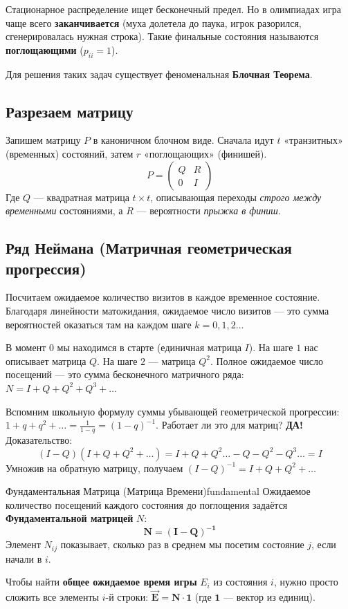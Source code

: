 \documentclass[12pt,a4paper]{article}
\begin{document}
Стационарное распределение ищет бесконечный предел. Но в олимпиадах игра чаще всего \textbf{заканчивается} (муха долетела до паука, игрок разорился, сгенерировалась нужная строка). Такие финальные состояния называются \textbf{поглощающими} ($p_{ii} = 1$). 

Для решения таких задач существует феноменальная \textbf{Блочная Теорема}.

\subsection{Разрезаем матрицу}
Запишем матрицу $P$ в каноничном блочном виде. Сначала идут $t$ «транзитных» (временных) состояний, затем $r$ «поглощающих» (финишей).
\[
P = \left( \begin{array}{c|c}
Q & R \\ \hline
0 & I
\end{array} \right)
\]
Где $Q$ — квадратная матрица $t \times t$, описывающая переходы \textit{строго между временными} состояниями, а $R$ — вероятности \textit{прыжка в финиш}.

\subsection{Ряд Неймана (Матричная геометрическая прогрессия)}
Посчитаем ожидаемое количество визитов в каждое временное состояние.
Благодаря линейности матожидания, ожидаемое число визитов — это сумма вероятностей оказаться там на каждом шаге $k=0, 1, 2 \dots$

В момент $0$ мы находимся в старте (единичная матрица $I$). На шаге $1$ нас описывает матрица $Q$. На шаге $2$ — матрица $Q^2$. Полное ожидаемое число посещений — это сумма бесконечного матричного ряда: $N = I + Q + Q^2 + Q^3 + \dots$

Вспомним школьную формулу суммы убывающей геометрической прогрессии: $1 + q + q^2 + \dots = \frac{1}{1-q} = (1-q)^{-1}$. Работает ли это для матриц? \textbf{ДА!}
Доказательство:
\[ (I - Q)(I + Q + Q^2 + \dots) = I + Q + Q^2 \dots - Q - Q^2 - Q^3 \dots = I \]
Умножив на обратную матрицу, получаем $(I - Q)^{-1} = I + Q + Q^2 + \dots$

\begin{theorem}{Фундаментальная Матрица (Матрица Времени)}{fundamental}
Ожидаемое количество посещений каждого состояния до поглощения задаётся \textbf{Фундаментальной матрицей} $N$:
\[ \mathbf{N = (I - Q)^{-1}} \]
Элемент $N_{ij}$ показывает, сколько раз в среднем мы посетим состояние $j$, если начали в $i$.

Чтобы найти \textbf{общее ожидаемое время игры} $E_i$ из состояния $i$, нужно просто сложить все элементы $i$-й строки: $\mathbf{\vec{E} = N \cdot \mathbf{1}}$ (где $\mathbf{1}$ — вектор из единиц).
\end{theorem}
\end{document}
